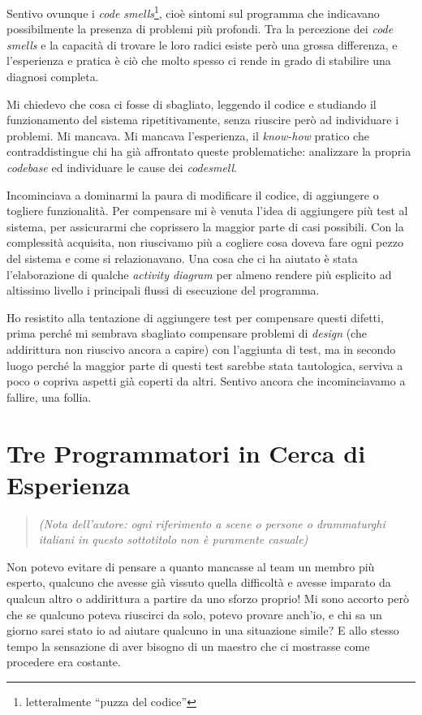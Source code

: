 \documentclass[12pt]{report}
\begin{document}
Sentivo ovunque i \textit{code smells}\footnote{
letteralmente ``puzza del codice''}, cioè sintomi sul programma che indicavano 
possibilmente la presenza di problemi più profondi. Tra la percezione dei 
\textit{code smells} e la capacità di trovare le loro radici esiste però una
grossa differenza, e l'esperienza e pratica è ciò che molto spesso ci rende
in grado di stabilire una diagnosi completa.

Mi chiedevo che cosa ci fosse di sbagliato, leggendo il codice e studiando il 
funzionamento del sistema ripetitivamente, senza riuscire però
ad individuare i problemi. Mi mancava. Mi mancava l'esperienza, 
il \textit{know-how} pratico che contraddistingue chi ha già affrontato
queste problematiche: analizzare la propria \textit{codebase} 
ed individuare le cause dei \textit{codesmell}.

Incominciava a dominarmi la paura di modificare il codice, di aggiungere o 
togliere funzionalità. Per compensare mi è venuta l'idea di aggiungere più test
al sistema, per assicurarmi che coprissero la maggior parte di casi possibili.
Con la complessità acquisita, non riuscivamo più a cogliere cosa doveva fare 
ogni pezzo del sistema e come si relazionavano. Una cosa che ci ha aiutato è
stata l'elaborazione di qualche \textit{activity diagram} per almeno rendere 
più esplicito ad altissimo livello i principali flussi di esecuzione 
del programma. 

Ho resistito alla tentazione di aggiungere test per compensare questi difetti,
prima perché mi sembrava sbagliato compensare problemi di \textit{design} (che
addirittura non riuscivo ancora a capire) con l'aggiunta
di test, ma in secondo luogo perché la maggior parte di questi test 
sarebbe stata tautologica, serviva a poco o copriva aspetti già coperti da 
altri. Sentivo ancora che incominciavamo a fallire, una follia.

\section{Tre Programmatori in Cerca di Esperienza}

\begin{quote}
\textit{
(Nota dell'autore: ogni riferimento a scene o persone o drammaturghi italiani
in questo sottotitolo non è puramente casuale)
}
\end{quote}

Non potevo evitare di pensare a quanto mancasse al team un membro più esperto,
qualcuno che avesse già vissuto quella difficoltà e avesse imparato 
da qualcun altro o addirittura a partire da uno sforzo proprio! 
Mi sono accorto però che se qualcuno poteva riuscirci da solo, potevo provare
anch'io, e chi sa un giorno sarei stato io ad aiutare qualcuno in una situazione 
simile? E allo stesso tempo la sensazione di aver bisogno di un maestro che ci mostrasse come procedere era costante.
\end{document}
